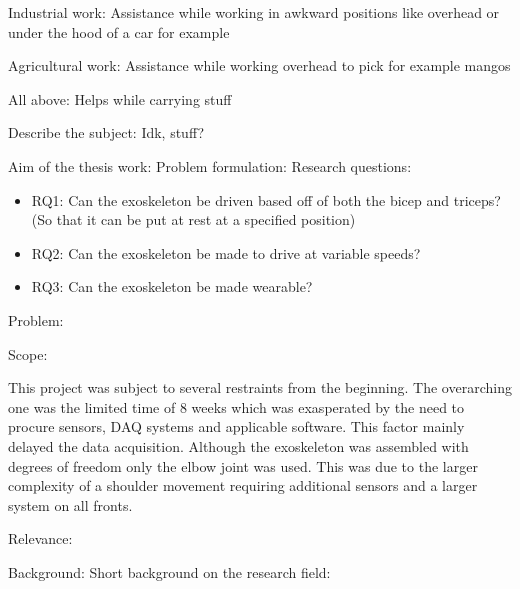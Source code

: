             Industrial work:
                Assistance while working in awkward positions like overhead or under the hood of a car for example

            Agricultural work:
                Assistance while working overhead to pick for example mangos
            
            All above:
                Helps while carrying stuff

    Describe the subject:
        Idk, stuff?

    Aim of the thesis work:
        Problem formulation: %
            Research questions:
            \begin{itemize}
                 
                \item RQ1: Can the exoskeleton be driven based off of both the bicep and triceps? (So that it can be put at rest at a specified position)
                
                \item RQ2: Can the exoskeleton be made to drive at variable speeds?
                
                \item RQ3: Can the exoskeleton be made wearable?
            \end{itemize}

            Problem:
                

            Scope:

            This project was subject to several restraints from the beginning. The overarching one was the limited time of 8 weeks which was
            exasperated by the need to procure sensors, DAQ systems and applicable software. This factor mainly delayed the data acquisition. 
            Although the exoskeleton was assembled with degrees of freedom only the elbow joint was used. This was due to the larger complexity 
            of a shoulder movement requiring additional sensors and a larger system on all fronts.
            
            Relevance: %


Background: 
    Short background on the research field:

